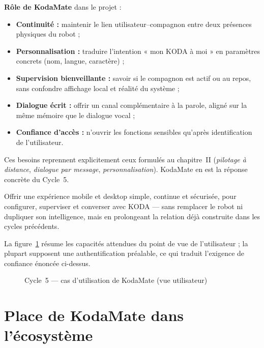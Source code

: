 \documentclass[a4paper,12pt]{report}
\begin{document}
	\textbf{Rôle de KodaMate} dans le projet :
	\begin{itemize}
		\item \textbf{Continuité :} maintenir le lien utilisateur--compagnon entre
		deux présences physiques du robot ;
		\item \textbf{Personnalisation :} traduire l'intention « mon KODA à moi » en
		paramètres concrets (nom, langue, caractère) ;
		\item \textbf{Supervision bienveillante :} savoir si le compagnon est actif ou
		au repos, sans confondre affichage local et réalité du système ;
		\item \textbf{Dialogue écrit :} offrir un canal complémentaire à la parole,
		aligné sur la même mémoire que le dialogue vocal ;
		\item \textbf{Confiance d'accès :} n'ouvrir les fonctions sensibles qu'après
		identification de l'utilisateur.
	\end{itemize}
	
	Ces besoins reprennent explicitement ceux formulés au chapitre~II
	(\emph{pilotage à distance}, \emph{dialogue par message}, \emph{personnalisation}).
	KodaMate en est la réponse concrète du Cycle~5.
	
	\begin{tcolorbox}[colback=blue!5!white, colframe=blue!60!black,
		title=\textbf{Objectif du Cycle 5}]
		Offrir une expérience mobile et desktop simple, continue et sécurisée, pour
		configurer, superviser et converser avec KODA --- sans remplacer le robot ni
		dupliquer son intelligence, mais en prolongeant la relation déjà construite
		dans les cycles précédents.
	\end{tcolorbox}
	
	La figure~\ref{fig:ch5-cas-utilisation} résume les capacités attendues du
	point de vue de l'utilisateur ; la plupart supposent une authentification
	préalable, ce qui traduit l'exigence de confiance énoncée ci-dessus.
	
	\begin{figure}[H]
		\centering
		\caption{Cycle~5 --- cas d'utilisation de KodaMate (vue utilisateur)}
		\label{fig:ch5-cas-utilisation}
	\end{figure}
	
	\section{Place de KodaMate dans l'écosystème}
	
\end{document}
